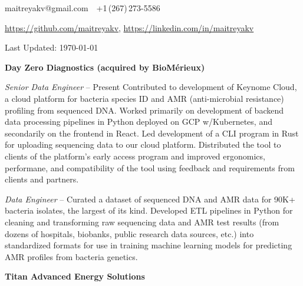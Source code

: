 \documentclass[letterpaper,MMMyyyy,nonstopmode]{simpleresumecv}
\newcommand{\CVAuthor}{Maitreya Venkataswamy}
\newcommand{\CVWebpage}{}
\begin{document}
\Title{\CVAuthor}

\begin{SubTitle}
maitreyakv@gmail.com
\,\SubBulletSymbol\,
+1\,(267)\,273-5586
\,
\href{\CVWebpage}
{\url{\CVWebpage}}
\par
\url{https://github.com/maitreyakv}, \url{https://linkedin.com/in/maitreyakv}
\par
Last Updated: \today
\end{SubTitle}

\begin{Body}


\Entry \textbf{Day Zero Diagnostics (acquired by BioM\'erieux)}

\Gap

\BulletItem \textit{Senior Data Engineer}
\hfill
{} -- Present
\SubBulletItem
  Contributed to development of Keynome Cloud, a cloud platform for bacteria species ID and AMR (anti-microbial resistance) profiling from sequenced DNA. Worked primarily on development of backend data processing pipelines in Python deployed on GCP w/Kubernetes, and secondarily on the frontend in React.
\SubBulletItem
Led development of a CLI program in Rust for uploading sequencing data to our cloud platform. Distributed the tool to clients of the platform's early access program and improved ergonomics, performane, and compatibility of the tool using feedback and requirements from clients and partners. 

\Gap

\BulletItem \textit{Data Engineer}
\hfill
{} -- 
\SubBulletItem
Curated a dataset of sequenced DNA and AMR data for 90K+ bacteria isolates, the largest of its kind. Developed ETL pipelines in Python for cleaning and transforming raw sequencing data and AMR test results (from dozens of hospitals, biobanks, public research data sources, etc.) into standardized formats for use in training machine learning models for predicting AMR profiles from bacteria genetics.

\BigGap

\Entry \textbf{Titan Advanced Energy Solutions}

\Gap


\end{Body}
\end{document}
